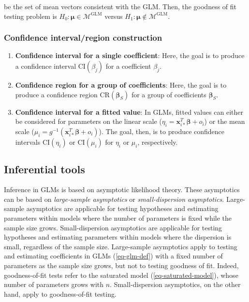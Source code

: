 \documentclass[
  11pt,
  letterpaper,
  oneside]{book}
\providecommand{\tightlist}{%
  \setlength{\itemsep}{0pt}\setlength{\parskip}{0pt}}\usepackage{longtable,booktabs,array}
\theoremstyle{plain}
\theoremstyle{plain}
\theoremstyle{definition}
\theoremstyle{definition}
\theoremstyle{plain}
\theoremstyle{remark}
\begin{document}
be the set of mean vectors consistent with the GLM. Then, the goodness
of fit testing problem is
\(H_0: \boldsymbol{\mu} \in \mathcal{M}^{\text{GLM}}\) versus
\(H_1: \boldsymbol{\mu} \notin \mathcal{M}^{\text{GLM}}\).

\hypertarget{sec-confidence-interval-region}{%
\subsubsection{Confidence interval/region
construction}\label{sec-confidence-interval-region}}

\begin{enumerate}
\def\labelenumi{\arabic{enumi}.}
\tightlist
\item
  \textbf{Confidence interval for a single coefficient}: Here, the goal
  is to produce a confidence interval \(\text{CI}(\beta_j)\) for a
  coefficient \(\beta_j\).
\item
  \textbf{Confidence region for a group of coefficients}: Here, the goal
  is to produce a confidence region \(\text{CR}(\boldsymbol{\beta}_S)\)
  for a group of coefficients \(\boldsymbol{\beta}_S\).
\item
  \textbf{Confidence interval for a fitted value}: In GLMs, fitted
  values can either be considered for parameters on the linear scale
  (\(\eta_i = \boldsymbol{x}_{i*}^T \boldsymbol{\beta} + o_i\)) or the
  mean scale
  (\(\mu_i = g^{-1}(\boldsymbol{x}_{i*}^T \boldsymbol{\beta} + o_i)\)).
  The goal, then, is to produce confidence intervals
  \(\text{CI}(\eta_i)\) or \(\text{CI}(\mu_i)\) for \(\eta_i\) or
  \(\mu_i\), respectively.
\end{enumerate}

\hypertarget{sec-inferential-tools}{%
\subsection{Inferential tools}\label{sec-inferential-tools}}

Inference in GLMs is based on asymptotic likelihood theory. These
asymptotics can be based on \emph{large-sample asymptotics} or
\emph{small-dispersion asymptotics}. Large-sample asymptotics are
applicable for testing hypotheses and estimating parameters within
models where the number of parameters is fixed while the sample size
grows. Small-dispersion asymptotics are applicable for testing
hypotheses and estimating parameters within models where the dispersion
is small, regardless of the sample size. Large-sample asymptotics apply
to testing and estimating coefficients in GLMs (\ref{eq-glm-def}) with a
fixed number of parameters as the sample size grows, but not to testing
goodness of fit. Indeed, goodness-of-fit tests refer to the saturated
model (\ref{eq-saturated-model}), whose number of parameters grows with
\(n\). Small-dispersion asymptotics, on the other hand, apply to
goodness-of-fit testing.
\end{document}
